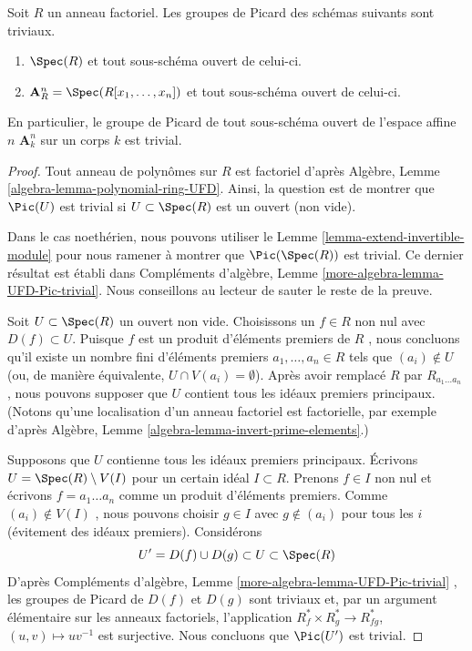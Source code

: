 \begin{lemma}
\label{lemma-open-subscheme-UFD}
Soit  $R$  un anneau factoriel. Les groupes de Picard des schémas suivants sont triviaux.
\begin{enumerate}
\item $\Spec(R)$  et tout sous-schéma ouvert de celui-ci.
\item $\mathbf{A}^n_R = \Spec(R[x_1, \ldots, x_n])$  et tout sous-schéma ouvert de celui-ci.
\end{enumerate}
En particulier, le groupe de Picard de tout sous-schéma ouvert de l'espace affine
 $n$  $\mathbf{A}^n_k$  sur un corps  $k$  est trivial.
\end{lemma}

\begin{proof}
Tout anneau de polynômes sur  $R$  est factoriel d'après Algèbre, Lemme
 \ref{algebra-lemma-polynomial-ring-UFD}. Ainsi, la question est de montrer que  $\Pic(U)$  est trivial si
 $U \subset \Spec(R)$  est un ouvert (non vide).

\medskip\noindent
Dans le cas noethérien, nous pouvons utiliser le Lemme  \ref{lemma-extend-invertible-module}  pour nous ramener à
montrer que  $\Pic(\Spec(R))$  est trivial. Ce dernier résultat est établi dans Compléments
d'algèbre, Lemme  \ref{more-algebra-lemma-UFD-Pic-trivial}. Nous conseillons au lecteur de sauter le reste de la
preuve.

\medskip\noindent
Soit  $U \subset \Spec(R)$  un ouvert non vide. Choisissons un  $f \in R$  non nul avec
 $D(f) \subset U$. Puisque  $f$  est un produit d'éléments premiers de
 $R$ , nous concluons qu'il existe un nombre fini d'éléments premiers
 $a_1, \ldots, a_n \in R$  tels que  $(a_i) \not \in U$  (ou, de manière équivalente,  $U \cap V(a_i) = \emptyset$). Après avoir
remplacé  $R$  par  $R_{a_1 \ldots a_n}$ , nous pouvons supposer que  $U$ 
contient tous les idéaux premiers principaux. (Notons qu'une localisation d'un anneau factoriel
est factorielle, par exemple d'après Algèbre, Lemme  \ref{algebra-lemma-invert-prime-elements}.)

\medskip\noindent
Supposons que  $U$  contienne tous les idéaux premiers principaux. Écrivons
 $U = \Spec(R) \setminus V(I)$  pour un certain idéal  $I \subset R$. Prenons  $f \in I$  non nul et
écrivons  $f = a_1 \ldots a_n$  comme un produit d’éléments premiers. Comme  $(a_i) \not \in V(I)$ ,
nous pouvons choisir  $g \in I$  avec  $g \not \in (a_i)$  pour tous les  $i$ 
(évitement des idéaux premiers). Considérons
$$
U' = D(f) \cup D(g) \subset U \subset \Spec(R)
$$
D'après Compléments d'algèbre, Lemme  \ref{more-algebra-lemma-UFD-Pic-trivial} , les groupes de Picard de
 $D(f)$  et  $D(g)$  sont triviaux et, par un argument élémentaire sur les
anneaux factoriels, l'application  $R_f^* \times R_g^* \to R_{fg}^*$,  $(u, v) \mapsto uv^{-1}$  est surjective. Nous concluons que
 $\Pic(U')$  est trivial.


\end{proof}
